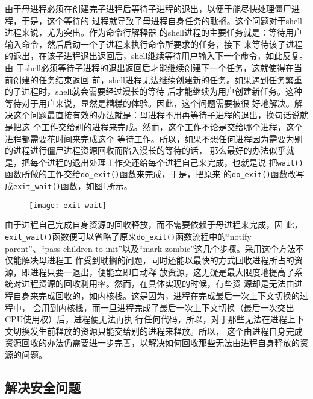 \documentclass{swfuthesism}
\begin{document}
由于母进程必须在创建完子进程后等待子进程的退出，以便于能尽快处理僵尸进程，于是，这个等待的
过程就导致了母进程自身任务的耽搁。这个问题对于shell进程来说，尤为突出。作为命令行解释器
的shell进程的主要任务就是：等待用户输入命令，然后启动一个子进程来执行命令所要求的任务，接下
来等待该子进程的退出，在该子进程退出返回后，shell继续等待用户输入下一个命令，如此反复。由
于shell必须等待子进程的退出返回后才能继续创建下一个任务，这就使得在当前创建的任务结束返回
前，shell进程无法继续创建新的任务。如果遇到任务繁重的子进程时，shell就会需要经过漫长的等待
后才能继续为用户创建新任务。这种等待对于用户来说，显然是糟糕的体验。因此，这个问题需要被很
好地解决。解决这个问题最直接有效的办法就是：母进程不用再等待子进程的退出，换句话说就是把这
个工作交给别的进程来完成。然而，这个工作不论是交给哪个进程，这个进程都需要花时间来完成这个
等待工作。所以，如果不想任何进程因为需要为别的进程进行僵尸进程资源回收而陷入漫长的等待的话，
那么最好的办法似乎就是，把每个进程的退出处理工作交还给每个进程自己来完成，也就是说
把\texttt{wait()}函数所做的工作交给\texttt{do\_exit()}函数来完成，于是，把原来
的\texttt{do\_exit()}函数改写成\texttt{exit\_wait()}函数，如图\ref{fig:exit-wait}所示。

\begin{figure}[tb]
  \centering
 \texttt{[image: exit-wait]}
  \label{fig:exit-wait}
\end{figure}

由于进程自己完成自身资源的回收释放，而不需要依赖于母进程来完成，因
此，\texttt{exit\_wait()}函数便可以省略了原来\texttt{do\_exit()}函数流程中的“notify
parent”、“pass children to init”以及“mark zombie”这几个步骤。采用这个方法不仅能解决母进程工
作受到耽搁的问题，同时还能以最快的方式回收进程所占的资源，即进程只要一退出，便能立即自动释
放资源，这无疑是最大限度地提高了系统对进程资源的回收利用率。然而，在具体实现的时候，有些资
源却是无法由进程自身来完成回收的，如内核栈。这是因为，进程在完成最后一次上下文切换的过程中，
会用到内核栈，而一旦进程完成了最后一次上下文切换（最后一次交出CPU使用权）后，进程便无法再执
行任何代码，所以，对于那些无法在进程上下文切换发生前释放的资源只能交给别的进程来释放。所以，
这个由进程自身完成资源回收的办法仍需要进一步完善，以解决如何回收那些无法由进程自身释放的资
源的问题。

\subsection{解决安全问题}
\end{document}

